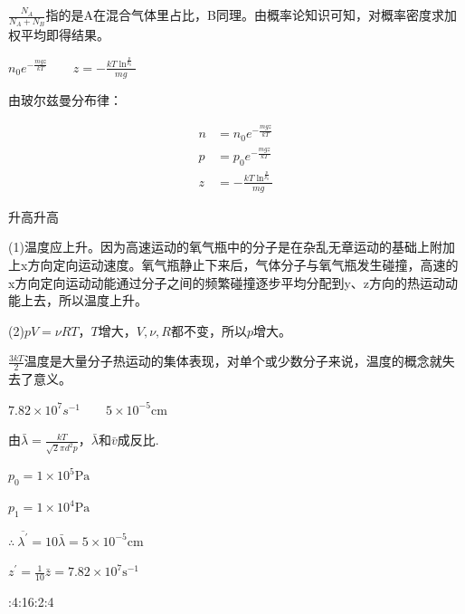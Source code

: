 \solve $\frac{N_A}{N_A+N_B}$指的是A在混合气体里占比，B同理。由概率论知识可知，对概率密度求加权平均即得结果。



\exercise
$n _ { 0 } e ^ { - \frac { m g z } { k T } } \qquad z = - \frac { k T \ln ^ { \frac { p } { p_0 } } } { m g }$

\solve 由玻尔兹曼分布律：

$$
\begin{aligned}
n & = n _ { 0 } e ^ { - \frac { m g z } { k T } } \\ p & = p _ { 0 } e ^ { - \frac { m g z } { k T } } \\ z & = - \frac { k T \ln ^ { \frac { p } { p _ { 0 } } } } { m g } \end{aligned}
$$

\exercise 升高\qquad 升高

\solve (1)温度应上升。因为高速运动的氧气瓶中的分子是在杂乱无章运动的基础上附加上x方向定向运动速度。氧气瓶静止下来后，气体分子与氧气瓶发生碰撞，高速的x方向定向运动动能通过分子之间的频繁碰撞逐步平均分配到y、z方向的热运动动能上去，所以温度上升。

(2)$pV=\nu RT$，$T$增大，$V,\nu,R$都不变，所以$p$增大。

\exercise $\frac{3kT}{2}$\qquad 温度是大量分子热运动的集体表现，对单个或少数分子来说，温度的概念就失去了意义。

\exercise $7.82 \times 10 ^ { 7 } s ^ { - 1 } \qquad5 \times 10 ^ { - 5 } \mathrm { cm }$

\solve
由$\bar { \lambda } = \frac { k T } { \sqrt { 2 } \pi d^2p }$，$\bar { \lambda } $和$\bar { v } $成反比.

$p _0= 1 \times 10 ^ { 5 }\mathrm{Pa}$

$p _1= 1 \times 10 ^ { 4 }\mathrm{Pa}$

${ \therefore\ \overline{\lambda^{\prime} } = 10 \bar { \lambda } = 5 \times 10 ^ { - 5 }\mathrm{ cm }}$

${ z ^{\prime } = \frac { 1 } { 10 } \bar { z } = 7.82 \times 10 ^ { 7 }\mathrm{s^{-1}}}$

:4:16:2:4

\solve

